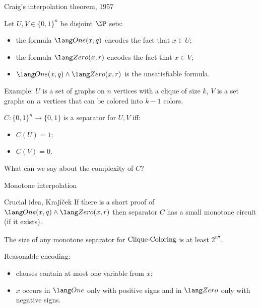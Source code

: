 \begin{frame}{Craig's interpolation theorem, 1957}

    Let $U, V \in \{0, 1\}^n$ be disjoint $\NP$ sets:
    \begin{itemize}
        \item the formula $\One(x, q)$ encodes the fact that $x \in U$;
        \item the formula $\Zero(x, r)$ encodes the fact that $x \in V$;
        \item $\One(x, q) \land \Zero(x, r)$ is the unsatisfiable formula.
            
    \end{itemize}

    \vspace{0.2cm}
    \pause
    Example: $U$ is a set of graphs on $n$ vertices with a clique of size $k$, $V$ is a set graphs on $n$
    vertices that can be colored into $k - 1$ colors.

    \pause
    \begin{definition}
	    $C: \{0, 1\}^n \to \{0, 1\}$ is a separator for $U, V$ iff:
        \begin{itemize}
            \item $C(U) = 1$;
            \item $C(V) = 0$.
        \end{itemize}        
    \end{definition}

    \pause
	What can we say about the complexity of $C$?

\end{frame}


\begin{frame}{Monotone interpolation}

    \begin{block}{Crucial idea, Kraj{\'{\i}}{\v{c}}ek}
        If there is a short proof of $\One(x, q) \land \Zero(x, r)$ then separator $C$ has a small
        \alert{monotone} {\color{blue} circuit} (if it exists). 
    \end{block}

    \begin{theorem}
        The size of any monotone separator for $\mathrm{Clique}\text{-}\mathrm{Coloring}$ is at least $2^{n^{\frac{1}{4}}}$.
    \end{theorem}

    \pause
    Reasonable encoding:
    \begin{itemize}
        \item clauses contain at most one variable from $x$;
        \item $x$ occurs in $\One$ only with positive signs and in $\Zero$ only with negative signs.
    \end{itemize}
\end{frame}

